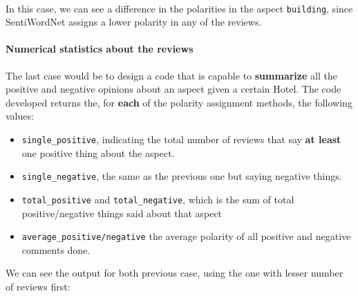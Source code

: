 \documentclass[11pt]{article}
\providecommand{\tightlist}{%
      \setlength{\itemsep}{0pt}\setlength{\parskip}{0pt}}
\begin{document}
\begin{center}
\end{center}
{ \hspace*{\fill} \\}

In this case, we can see a difference in the polarities in the aspect
\texttt{building}, since SentiWordNet assigns a lower polarity in any of
the reviews.

\hypertarget{numerical-statistics-about-the-reviews}{%
    \paragraph{Numerical statistics about the
        reviews}\label{numerical-statistics-about-the-reviews}}

The last case would be to design a code that is capable to
\textbf{summarize} all the positive and negative opinions about an
aspect given a certain Hotel. The code developed returns the, for
\textbf{each} of the polarity assignment methods, the following values:

\begin{itemize}
    \tightlist
    \item
          \texttt{single\_positive}, indicating the total number of reviews that
          say \textbf{at least} one positive thing about the aspect.
    \item
          \texttt{single\_negative}, the same as the previous one but saying
          negative things.
    \item
          \texttt{total\_positive} and \texttt{total\_negative}, which is the
          sum of total positive/negative things said about that aspect
    \item
          \texttt{average\_positive/negative} the average polarity of all
          positive and negative comments done.
\end{itemize}

We can see the output for both previous case, using the one with lesser
number of reviews first:
\end{document}

